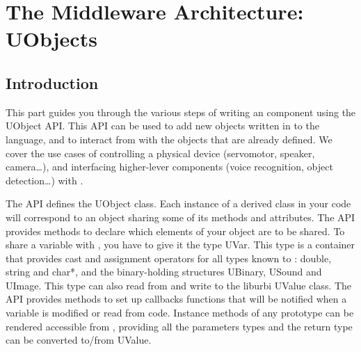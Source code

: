 \part[The Middleware Architecture: UObjects]
     {The Middleware Architecture:\\UObjects}
\label{part:uobject}

\chapter*{Introduction}
This part guides you through the various steps of writing an \urbi
\Cxx component using the UObject API. This API can be used to add new
objects written in \Cxx to the \us language, and to interact from
\Cxx with the objects that are already defined. We cover the use cases
of controlling a physical device (servomotor, speaker, camera\ldots), and
interfacing higher-lever components (voice recognition, object
detection\ldots) with \urbi.

The API defines the UObject class. Each instance of a derived class in
your \Cxx code will correspond to an \us object sharing some of its
methods and attributes. The API provides methods to declare which
elements of your object are to be shared. To share a variable with
\urbi, you have to give it the type UVar. This type is a container that
provides cast and assignment operators for all types known to \urbi: double,
string and char*, and the binary-holding structures UBinary, USound
and UImage. This type can also read from and write to the liburbi
UValue class. The API provides methods to set up callbacks functions
that will be notified when a variable is modified or read from \urbi
code. Instance methods of any prototype can be rendered accessible
from \us, providing all the parameters types and the return type can
be converted to/from UValue.

%
%





